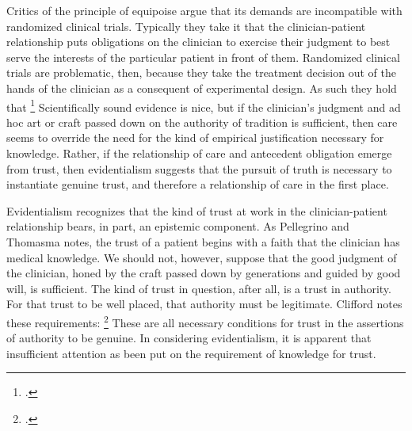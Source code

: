 \documentclass[letterpaper,notitlepage,12pt]{article}
\begin{document}
Critics of the principle of equipoise argue that its demands are incompatible
with randomized clinical trials.
Typically they take it that the clinician-patient relationship puts obligations on
the clinician to exercise their judgment to best serve the interests of the
particular patient in front of them.
Randomized clinical trials are problematic, then, because they take the
treatment decision out of the hands of the clinician as a consequent of
experimental design. As such they hold that \footcite[p. 1587]{hellman_mice_1991}
Scientifically sound evidence is nice, but if the clinician's judgment and ad hoc
art or craft passed down on the authority of tradition is sufficient, then care
seems to override the need for the kind of empirical justification necessary for
knowledge.
Rather, if the relationship of care and antecedent obligation emerge from trust,
then evidentialism suggests that the pursuit of truth is necessary to
instantiate genuine trust, and therefore a relationship of care in the first
place.

Evidentialism recognizes that the kind of trust at work in the clinician-patient
relationship bears, in part, an epistemic component.
As Pellegrino and Thomasma notes, the trust of a patient begins with a faith that
the clinician has medical knowledge.
We should not, however, suppose that the good judgment of the clinician, honed
by the craft passed down by generations and guided by good will, is sufficient.
The kind of trust in question, after all, is a trust in authority.
For that trust to be well placed, that authority must be legitimate.
Clifford notes these requirements: \footcite[p.
348]{clifford_ethics_1886}
These are all necessary conditions for trust in the assertions of authority to
be genuine.
In considering evidentialism, it is apparent that insufficient attention as been
put on the requirement of knowledge for trust.
\end{document}
